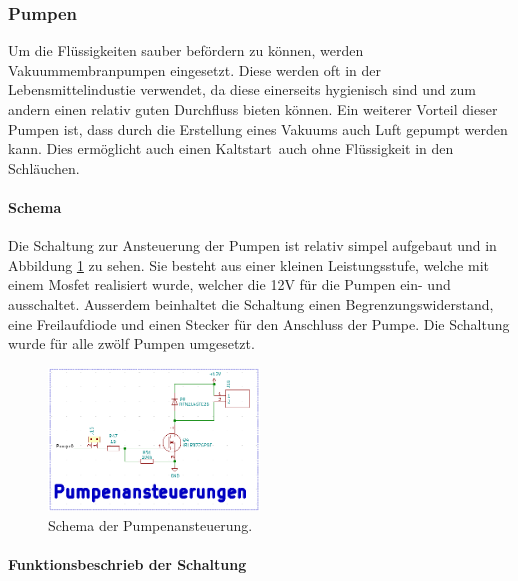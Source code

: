 \subsubsection{Pumpen}
\label{subsubsec:Pumpen}

Um die Flüssigkeiten sauber befördern zu können, werden Vakuummembranpumpen eingesetzt. Diese werden oft in der Lebensmittelindustie verwendet, da diese einerseits hygienisch sind und zum andern einen relativ guten Durchfluss bieten können. Ein weiterer Vorteil dieser Pumpen ist, dass durch die Erstellung eines Vakuums auch Luft gepumpt werden kann. Dies ermöglicht auch einen \flqq Kaltstart\frqq\ auch ohne Flüssigkeit in den Schläuchen. \cite{aiyimaindustrial_store_us_nodate}

\paragraph{Schema}\mbox{}

Die Schaltung zur Ansteuerung der Pumpen ist relativ simpel aufgebaut und in Abbildung \ref{fig:Schema_Pumpenansteuerung} zu sehen. Sie besteht aus einer kleinen Leistungsstufe, welche mit einem Mosfet realisiert wurde, welcher die 12V für die Pumpen  ein- und ausschaltet. Ausserdem beinhaltet die Schaltung einen Begrenzungswiderstand, eine Freilaufdiode und einen Stecker für den Anschluss der Pumpe. Die Schaltung wurde für alle zwölf Pumpen umgesetzt. \cite{aiyimaindustrial_store_us_nodate}

\begin{figure}[h!]
	\centering
	\includegraphics[width=0.5\textwidth]{graphics/Schema_Pumpenansteuerung.png}
	\caption{Schema der Pumpenansteuerung.}
	\label{fig:Schema_Pumpenansteuerung}
\end{figure}

\paragraph{Funktionsbeschrieb der Schaltung}\mbox{}

